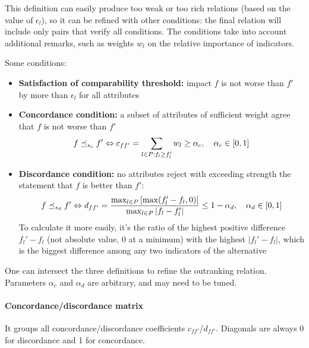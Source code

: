 This definition can easily produce too weak or too rich relations (based on the value of $\epsilon_l$), so it can be refined with other conditions: the final relation will include only pairs that verify all conditions. The conditions take into account additional remarks, such as weights $w_l$ on the relative importance of indicators.

Some conditions: 
\begin{itemize}
	\item \textbf{Satisfaction of comparability threshold:} impact $f$ is not worse than $f'$ by more than $\epsilon_l$ for all attributes
	
	\item \textbf{Concordance condition:} a subset of attributes of sufficient weight agree that $f$ is not worse than $f'$
	$$ f \preceq_{s_c} f' \Leftrightarrow c_{ff'} = \sum_{l \in P: f_l \geq f_l'} w_l \geq \alpha_c, \quad \alpha_c \in [0,1] $$
	
	\item \textbf{Discordance condition:} no attributes reject with exceeding strength the statement that $f$ is better than $f'$:
	$$ f \preceq_{s_d} f' \Leftrightarrow d_{ff'} = \frac{\max_{l \in P} \left[\max (f_l' - f_l, 0)\right]}{\max_{l \in P} |f_l - f_l'|} \leq 1 - \alpha_d, \quad \alpha_d \in [0,1] $$
    To calculate it more easily, it's the ratio of the highest positive difference $f_l' - f_l$ (not absolute value, 0 at a minimum) with the highest $|f_l' - f_l|$, which is the biggest difference among any two indicators of the alternative
\end{itemize}
One can intersect the three definitions to refine the outranking relation. Parameters $\alpha_c$  and $\alpha_d$ are arbitrary, and may need to be tuned.

\paragraph{Concordance/discordance matrix} It groups all concordance/discordance coefficients $c_{ff'}$/$d_{ff'}$. Diagonals are always 0 for discordance and 1 for concordance.

